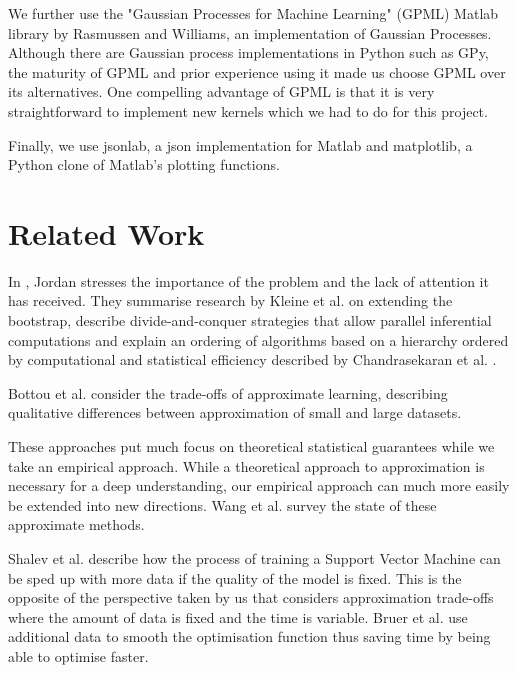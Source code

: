 \documentclass[a4paper,12pt,twoside,openright]{report}
\begin{document}
We further use the "Gaussian Processes for Machine Learning" (GPML) Matlab library by Rasmussen and Williams, an implementation of Gaussian Processes. Although there are Gaussian process implementations in Python such as GPy, the maturity of GPML and prior experience using it made us choose GPML over its alternatives. One compelling advantage of GPML is that it is very straightforward to implement new kernels which we had to do for this project.

Finally, we use jsonlab, a json implementation for Matlab and matplotlib, a Python clone of Matlab's plotting functions.



\chapter{Related Work}


In \cite{jordan2013}, Jordan stresses the importance of the problem and the lack of attention it has received. They summarise research by Kleine et al. \cite{RSSB:RSSB12050} on extending the bootstrap, describe divide-and-conquer strategies that allow parallel inferential computations and explain an ordering of algorithms based on a hierarchy ordered by computational and statistical efficiency described by Chandrasekaran et al. \cite{Chandrasekaran26032013}.

Bottou et al. \cite{Bottou08thetradeoffs} consider the trade-offs of approximate learning, describing qualitative differences between approximation of small and large datasets. 

These approaches put much focus on theoretical statistical guarantees while we take an empirical approach. While a theoretical approach to approximation is necessary for a deep understanding, our empirical approach can much more easily be extended into new directions. Wang et al. \cite{2015arXiv150207989W} survey the state of these approximate methods.

Shalev et al. \cite{Shalev-Shwartz:2008:SOI:1390156.1390273} describe how the process of training a Support Vector Machine can be sped up with more data if the quality of the model is fixed. This is the opposite of the perspective taken by us that considers approximation trade-offs where the amount of data is fixed and the time is variable. Bruer et al. \cite{NIPS2014_5259} use additional data to smooth the optimisation function thus saving time by being able to optimise faster.
\end{document}
